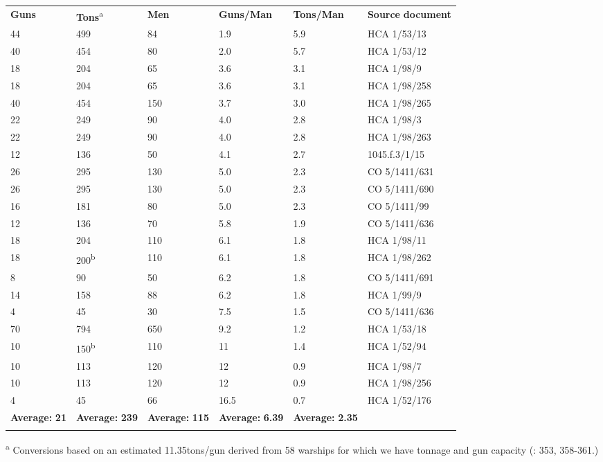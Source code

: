 \begin{tabularx}{\textwidth}{XXXXXX}
\lsptoprule

 \textbf{Guns} &  \textbf{Tons}\textsuperscript{a} &  \textbf{Men} & \textbf{Guns/Man} & \textbf{Tons/Man} & \textbf{Source} \textbf{document}\\
 44 &  499 &  84 & 1.9 & 5.9 & HCA 1/53/13\\
 40 &  454 &  80 & 2.0 & 5.7 & HCA 1/53/12\\
 18 &  204 &  65 & 3.6 & 3.1 & HCA 1/98/9 \\
 18 &  204 &  65 & 3.6 & 3.1 & HCA 1/98/258\\
 40 &  454 &  150 & 3.7 & 3.0 & HCA 1/98/265\\
 22 &  249 &  90 & 4.0 & 2.8 & HCA 1/98/3\\
 22 &  249 &  90 & 4.0 & 2.8 & HCA 1/98/263\\
 12 &  136 &  50 & 4.1 & 2.7 & 1045.f.3/1/15\\
 26 &  295 &  130 & 5.0 & 2.3 & CO 5/1411/631\\
 26 &  295 &  130 & 5.0 & 2.3 & CO 5/1411/690\\
 16 &  181 &  80 & 5.0 & 2.3 & CO 5/1411/99\\
 12 &  136 &  70 & 5.8 & 1.9 & CO 5/1411/636\\
 18 &  204 &  110 & 6.1 & 1.8 & HCA 1/98/11\\
 18 &  200\textsuperscript{b} &  110 & 6.1 & 1.8 & HCA 1/98/262\\
 8 &  90 &  50 & 6.2 & 1.8 & CO 5/1411/691\\
 14 &  158 &  88 & 6.2 & 1.8 & HCA 1/99/9\\
 4 &  45 &  30 & 7.5 & 1.5 & CO 5/1411/636\\
 70 &  794 &  650 & 9.2 & 1.2 & HCA 1/53/18\\
 10 &  150\textsuperscript{b} &  110 & 11 & 1.4 & HCA 1/52/94\\
 10 &  113 &  120 & 12 & 0.9 & HCA 1/98/7\\
 10 &  113 &  120 & 12 & 0.9 & HCA 1/98/256\\
 4 &  45 &  66 & 16.5 & 0.7 & HCA 1/52/176\\
 \textbf{Average:} \textbf{21} &  \textbf{Average:} \textbf{239} &  \textbf{Average:} \textbf{115} & \textbf{Average:} \textbf{6.39} & \textbf{Average:} \textbf{2.35} & \\
\lspbottomrule
\end{tabularx}
\textsuperscript{a}\textbf{\textsuperscript{} }Conversions based on an estimated 11.35tons/gun derived from 58 warships for which we have tonnage and gun capacity (\citealt{Bicheno2012}: 353, 358-361.) 

